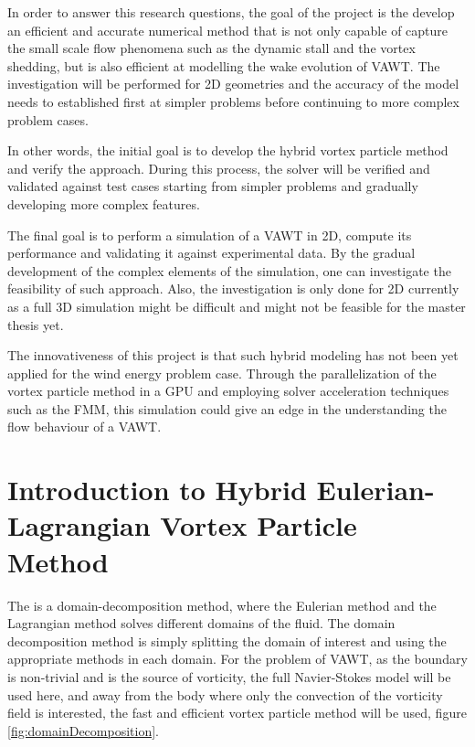 In order to answer this research questions, the goal of the project is the develop an efficient and accurate
numerical method that is not only capable of capture the small scale flow phenomena such as the dynamic stall and the vortex shedding, but is also efficient at modelling the wake evolution of VAWT. The investigation will be performed for 2D geometries and the accuracy of the model needs to established first at simpler problems before continuing to more complex problem cases.

In other words, the initial goal is to develop the hybrid vortex particle method and verify the approach. During this process, the solver will be verified and validated against test cases starting from simpler problems and gradually developing more complex features.

The final goal is to perform a simulation of a VAWT in 2D, compute its performance and validating it against experimental data. By the gradual development of the complex elements of the simulation, one can investigate the feasibility of such approach. Also, the investigation is only done for 2D currently as a full 3D simulation might be difficult and might not be feasible for the master thesis yet.

The innovativeness of this project is that such hybrid modeling has not been yet applied for the wind energy problem case. Through the parallelization of the vortex particle method in a GPU and employing solver acceleration techniques such as the FMM, this simulation could give an edge in the understanding the flow behaviour of a VAWT.

\section{Introduction to Hybrid Eulerian-Lagrangian Vortex Particle Method}

The  is a domain-decomposition method, where the Eulerian method and the Lagrangian method solves different domains of the fluid. The domain decomposition method is simply splitting the domain of interest and using the appropriate methods in each domain. For the problem of VAWT, as the boundary is non-trivial and is the source of vorticity, the full Navier-Stokes model will be used here, and away from the body where only the convection of the vorticity field is interested, the fast and efficient vortex particle method will be used, figure \ref{fig:domainDecomposition}.

